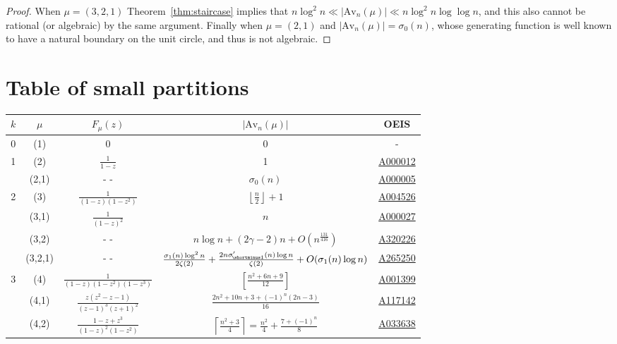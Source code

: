 \documentclass{article}
\theoremstyle{plain}
\theoremstyle{definition}
\newcommand{\Av}{\text{Av}}
\begin{document}
\begin{proof}
When $\mu=(3,2,1)$ Theorem~\ref{thm:staircase} implies that $n\log^2 n \ll |\Av_n(\mu)| \ll n\log^2 n \log \log n$, and this also cannot be rational (or algebraic) by the same argument.  Finally when $\mu=(2,1)$ and $|\Av_n(\mu)|=\sigma_0(n)$, whose generating function is well known to have a natural boundary on the unit circle, and thus is not algebraic.

\end{proof}

\pagebreak

\section*{Table of small partitions}
\begin{table}[!h]
    \centering
    \begin{tabular}{|c|c|c|c|c|}
    \hline
        $k$ & $\mu$ & $F_\mu(z)$ & $|\Av_n(\mu)|$ & OEIS \\
        \hline
        0 & (1) & 0 & 0 & - \\
        1 & (2) & $\frac{1}{1-z}$ & 1 & \href{http://oeis.org/A000012}{A000012}\\
          & (2,1) & - - & $\sigma_0(n)$ & \href{http://oeis.org/A000005}{A000005}\\
        2 & (3) & $\frac{1}{(1-z)(1-z^2)}$& $\left\lfloor\frac{n}{2}\right\rfloor+1$  & \href{http://oeis.org/A004526}{A004526}\\
          & (3,1) & $\frac{1}{(1-z)^2} $ & $n$ & \href{http://oeis.org/A000027}{A000027}\\
          & (3,2) & - -  & $n \log n +(2\gamma{-}2)n +O\left(n^{\frac{131}{416}}\right)$ &  \href{http://oeis.org/A320226}{A320226}\\
          & (3,2,1) & - -  &  $\frac{\sigma_{1}(n)\log^2 n}{2\zeta(2)}  +\frac{2n\sigma_{\hspace{-0.3mm}\shortminus 1}'(n)\log n }{\zeta(2)} + O(\sigma_1(n)\log n)$ & \href{http://oeis.org/A265250}{A265250} \\
        3  & (4) & $\frac{1}{(1-z)(1-z^2)(1-z^3)}$ & $\left[\frac{n^2+6n+9}{12}\right]$ & \href{http://oeis.org/A001399}{A001399}\\
          &  (4,1) & $\frac{z(z^2 - z - 1)}{(z - 1)^3(z + 1)^2}$& $\frac{2n^2 + 10n + 3 + (-1)^n (2n - 3)}{16}$&\href{http://oeis.org/A117142}{A117142} \\
          &  (4,2) & $\frac{1-z+z^3}{(1-z)^2(1-z^2)}$ & $\left\lceil\frac{n^2+3}{4}\right\rceil = \frac{n^2}{4} + \frac{7 + (-1)^n}{8}$ & \href{http://oeis.org/A033638}{A033638}\\

\end{tabular}
\end{table}
\end{document}
